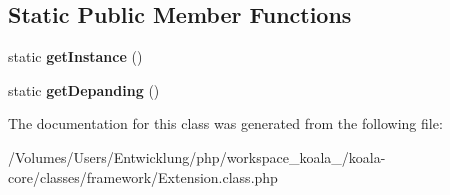 \subsection*{Static Public Member Functions}
\begin{DoxyCompactItemize}
\item 
\hypertarget{class_extension_afba448d3d5a855b5d27b98c442fe5ebb}{
static {\bfseries getInstance} ()}
\label{class_extension_afba448d3d5a855b5d27b98c442fe5ebb}

\item 
\hypertarget{class_extension_accfa84c281384cdd763eb9a4de2f1b72}{
static {\bfseries getDepanding} ()}
\label{class_extension_accfa84c281384cdd763eb9a4de2f1b72}

\end{DoxyCompactItemize}


The documentation for this class was generated from the following file:\begin{DoxyCompactItemize}
\item 
/Volumes/Users/Entwicklung/php/workspace\_\-koala\_/koala-\/core/classes/framework/Extension.class.php\end{DoxyCompactItemize}
